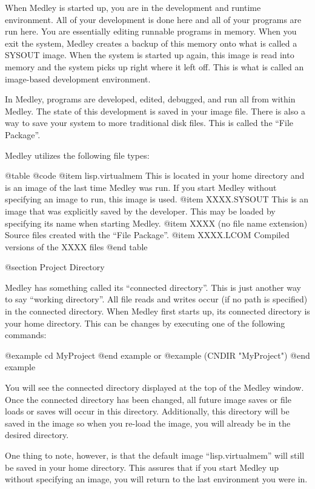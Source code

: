 When Medley is started up, you are in the development and runtime
environment.  All of your development is done here and all of your
programs are run here.  You are essentially editing runnable programs
in memory.  When you exit the system, Medley creates a backup of this
memory onto what is called a SYSOUT image.  When the system is started
up again, this image is read into memory and the system picks up right
where it left off.  This is what is called an image-based development
environment.

In Medley, programs are developed, edited, debugged, and run all from
within Medley.  The state of this development is saved in your image file.
There is also a way to save your system to more traditional
disk files.  This is called the ``File Package''.

Medley utilizes the following file types:

@table @code
@item lisp.virtualmem
This is located in your home directory and is an image of the last
time Medley was run.  If you start Medley without specifying an image to run, 
this image is used.
@item XXXX.SYSOUT
This is an image that was explicitly saved by the developer.  This may
be loaded by specifying its name when starting Medley.
@item XXXX (no file name extension)
Source files created with the ``File Package''.
@item XXXX.LCOM
Compiled versions of the XXXX files
@end table

@section Project Directory

Medley has something called its ``connected directory''.  This is just
another way to say ``working directory''.  All file reads and writes
occur (if no path is specified) in the connected directory.  When Medley
first starts up, its connected directory is your home directory.  This
can be changes by executing one of the following commands:

@example
cd MyProject
@end example
or
@example
(CNDIR "MyProject")
@end example

You will see the connected directory displayed at the top of the Medley
window.  Once the connected directory has been changed, all future
image saves or file loads or saves will occur in this directory.  Additionally,
this directory will be saved in the image so when you re-load the image, you 
will already be in the desired directory.

One thing to note, however, is that the default image
``lisp.virtualmem'' will still be saved in your home directory.  This
assures that if you start Medley up without specifying an image, you
will return to the last environment you were in.


